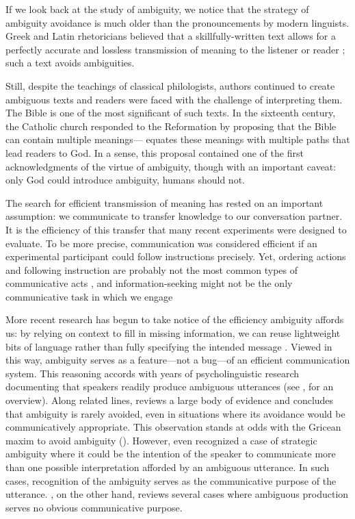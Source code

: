 \documentclass[11pt,a4paper]{article}
\newcommand{\gcs}[1]{\textcolor{blue}{[gcs: #1]}}
\begin{document}
If we look back at the study of ambiguity, we notice that the strategy of ambiguity avoidance is much older than the pronouncements by modern linguists. Greek and Latin rhetoricians believed that a skillfully-written text allows for a perfectly accurate and lossless transmission of meaning to the listener or reader \cite{ossarichardson2019}; such a text avoids ambiguities.

Still, despite the teachings of classical philologists, authors continued to  create ambiguous texts and readers were faced with the challenge of interpreting them. The Bible is one of the most significant of such texts. In the sixteenth century, the Catholic church responded to the Reformation by proposing that the Bible can contain multiple meanings--- equates these meanings with multiple paths that lead readers to God. In a sense, this proposal contained one of the first acknowledgments of the virtue of ambiguity, though with an important caveat: only God could introduce ambiguity, humans should not. 

The search for efficient transmission of meaning has rested on an important assumption: we communicate to transfer knowledge to our conversation partner. It is the efficiency of this transfer that many recent experiments were designed to evaluate. To be more precise, communication was considered efficient if an experimental participant could follow instructions precisely. Yet, ordering actions and following instruction are probably not  the most common types of communicative acts \cite{foppa1995mutual}, and information-seeking might not be the only communicative task in which we engage \cite{markova1995preface}

More recent research has begun to take notice of the efficiency ambiguity affords us: by relying on context to fill in missing information, we can reuse lightweight bits of language rather than fully specifying the intended message \cite{levinson2000,piantadosietal2012,wasow2015}. 
Viewed in this way, ambiguity serves as a feature---not a bug---of an efficient communication system.
This reasoning accords with years of psycholinguistic research documenting that speakers readily produce ambiguous utterances (see , for an overview). 
Along related lines,  reviews a large body of evidence and concludes that ambiguity is rarely avoided, even in situations where its avoidance would be communicatively appropriate.
This observation stands at odds with the Gricean maxim to avoid ambiguity ().
However, even \citeauthor{grice1975} recognized a case of strategic ambiguity where it could be the intention of the speaker to communicate more than one possible interpretation afforded by an ambiguous utterance. In such cases, recognition of the ambiguity serves as the communicative purpose of the utterance. , on the other hand, reviews several cases where ambiguous production serves no obvious communicative purpose.
\end{document}
